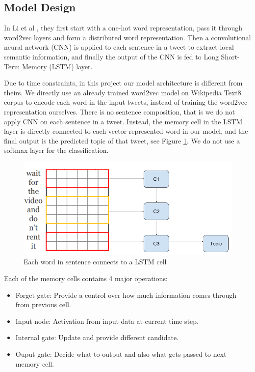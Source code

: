 \documentclass[journal, a4paper]{IEEEtran}
\begin{document}
\subsection{Model Design}
In Li et al \cite{Li-lstm}, they first start with a one-hot word representation, pass it through word2vec layers and form a distributed word representation. Then a convolutional neural network (CNN) is applied to each sentence in a tweet to extract local semantic information, and finally the output of the CNN is fed to Long Short-Term Memory (LSTM) layer. 

Due to time constraints, in this project our model architecture is different from theirs. We directly use an already trained word2vec model on Wikipedia Text8 corpus to encode each word in the input tweets, instead of training the word2vec representation ourselves. There is no sentence composition, that is we do not apply CNN on each sentence in a tweet. Instead, the memory cell in the LSTM layer is directly connected to each vector represented word in our model, and the final output is the predicted topic of that tweet, see Figure \ref{fig:4}. We do not use a softmax layer for the classification.
\begin{figure}[!hbt]
	\centering
	\includegraphics[width=\columnwidth]{cell.png}
	\caption{Each word in sentence connects to a LSTM cell}
	\label{fig:4}
\end{figure}

Each of the memory cells contains 4 major operations: 
\begin{itemize}
\item Forget gate: Provide a control over how much information comes through from previous cell.
\item Input node: Activation from input data at current time step.
\item Internal gate: Update and provide different candidate.
\item Ouput gate: Decide what to output and also what gets passed to next memory cell.
\end{itemize} 
\end{document}
